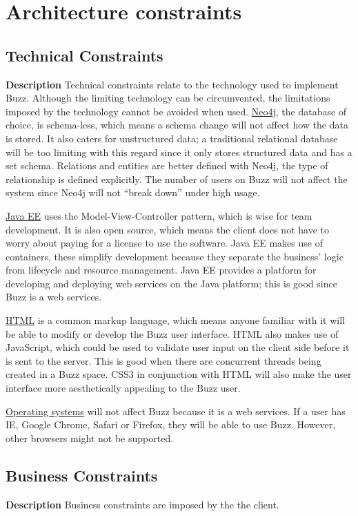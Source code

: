 \documentclass{article}
\begin{document}
\section{Architecture constraints}
\subsection{Technical Constraints} \newline \newline
\textbf{Description}
Technical constraints relate to the technology used to implement Buzz. Although the limiting technology can be circumvented, the limitations imposed by the technology cannot be avoided when used. \newline
\underline{Neo4j}, the database of choice, is schema-less, which means a schema change will not affect how the data is stored. It also caters for unstructured data; a traditional relational database will be too limiting with this regard since it only stores structured data and has a set schema. Relations and entities are better defined with Neo4j, the type of relationship is defined explicitly. The number of users on Buzz will not affect the system since Neo4j will not “break down” under high usage. \par
\underline{Java EE} uses the Model-View-Controller pattern, which is wise for team development. It is also open source, which means the client does not have to worry about paying for a license to use the software. Java EE makes use of containers, these simplify development because they separate the business’  logic from lifecycle and resource management. Java EE provides a platform for developing and deploying web services on the Java platform; this is good since Buzz is a web services. \par
\underline{HTML} is a common markup language, which means anyone familiar with it will be able to modify or develop the Buzz user interface. HTML also makes use of JavaScript, which could be used to validate user input on the client side before it is sent to the server. This is good when there are concurrent threads being created in  a Buzz space. CSS3 in conjunction with HTML will also make the user interface more aesthetically appealing to the Buzz user.\par 
\underline{Operating systems} will not affect Buzz because it is a web services. If a user has IE, Google Chrome, Safari or Firefox, they will be able to use Buzz. However, other browsers might not be supported. 
\subsection{Business Constraints}
\textbf{Description}
Business constraints are imposed by the the client.
\end{document}
